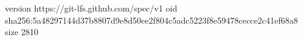 version https://git-lfs.github.com/spec/v1
oid sha256:5a48297144d37b8807d9e8d50ee2f804c5adc5223f8e59478cecce2c41ef68a8
size 2810
